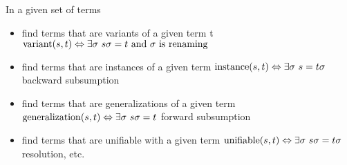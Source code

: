 
\begin{definition}
In a given set of terms
\begin{itemize}

\item find terms that are variants of a given term t
$\operatorname{variant}(s,t)\Leftrightarrow \exists\sigma\ s\sigma = t\text{ and }\sigma\text{ is renaming}$

\item find terms that are  instances of a given term  
$\operatorname{instance}(s,t)\Leftrightarrow\exists\sigma\ s = t\sigma$
\hfill{\colG\footnotesize backward subsumption}

\item find terms that are  generalizations of a given term
$\operatorname{generalization}(s,t)\Leftrightarrow\exists\sigma\ s\sigma = t$
\hfill{\colG\footnotesize forward subsumption}

\item {find terms that are  unifiable with a given term} 
$\UNIF(s,t)\Leftrightarrow\exists\sigma\ s\sigma = t\sigma$
\hfill{\colG\footnotesize resolution, etc.}

\end{itemize}
\end{definition}
